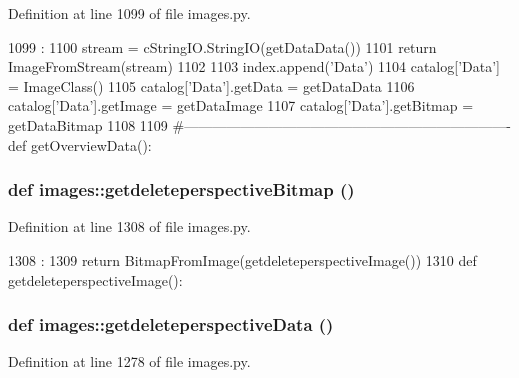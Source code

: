 Definition at line 1099 of file images.py.


\begin{DoxyCode}
1099                   :
1100     stream = cStringIO.StringIO(getDataData())
1101     return ImageFromStream(stream)
1102 
1103 index.append('Data')
1104 catalog['Data'] = ImageClass()
1105 catalog['Data'].getData = getDataData
1106 catalog['Data'].getImage = getDataImage
1107 catalog['Data'].getBitmap = getDataBitmap
1108 
1109 #----------------------------------------------------------------------
def getOverviewData():
\end{DoxyCode}
\hypertarget{namespaceimages_a89d3e7bf7417546fa0f6e087fa84dd5b}{
\subsubsection[{getdeleteperspectiveBitmap}]{\setlength{\rightskip}{0pt plus 5cm}def images::getdeleteperspectiveBitmap ()}}
\label{namespaceimages_a89d3e7bf7417546fa0f6e087fa84dd5b}


Definition at line 1308 of file images.py.


\begin{DoxyCode}
1308                                 :
1309     return BitmapFromImage(getdeleteperspectiveImage())
1310 
def getdeleteperspectiveImage():
\end{DoxyCode}
\hypertarget{namespaceimages_a84210c8f60dfc02454746435fc644ae4}{
\subsubsection[{getdeleteperspectiveData}]{\setlength{\rightskip}{0pt plus 5cm}def images::getdeleteperspectiveData ()}}
\label{namespaceimages_a84210c8f60dfc02454746435fc644ae4}


Definition at line 1278 of file images.py.


